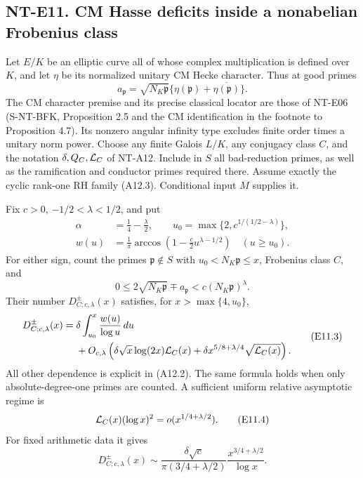 \subsection*{NT-E11. CM Hasse deficits inside a nonabelian Frobenius class}

Let \(E/K\) be an elliptic curve all of whose complex
multiplication is defined over \(K\), and let \(\eta\) be its
normalized unitary CM Hecke character. Thus at good primes
\[
 a_{\mathfrak p}
     =\sqrt{N_K\mathfrak p}
          \{\eta(\mathfrak p)+\overline{\eta(\mathfrak p)}\}.
                                                               \tag{E11.1}
\]
The CM character premise and its precise classical locator
are those of NT-E06 (S-NT-BFK, Proposition 2.5 and the CM
identification in the footnote to Proposition 4.7).
Its nonzero angular infinity type excludes finite order
times a unitary norm power.
Choose any finite Galois \(L/K\), any conjugacy class \(C\),
and the notation \(\delta,Q_C,{\cal L}_C\) of NT-A12.
Include in \(S\) all bad-reduction primes, as well as the
ramification and conductor primes required there.
Assume exactly the cyclic rank-one RH family (A12.3).
Conditional input \(M\) supplies it.

Fix \(c>0\), \(-1/2<\lambda<1/2\), and put
\[
 \begin{aligned}
 \alpha&=\frac14-\frac{\lambda}{2},\qquad
 u_0=\max\{2,c^{1/(1/2-\lambda)}\},\\
 w(u)&=\frac1\pi
       \arccos\left(1-\frac c2 u^{\lambda-1/2}\right)
                  \quad(u\ge u_0).
 \end{aligned}                                             \tag{E11.2}
\]
For either sign, count the primes \(\mathfrak p\notin S\)
with \(u_0<N_K\mathfrak p\le x\), Frobenius class \(C\), and
\[
       0\le 2\sqrt{N_K\mathfrak p}\mp a_{\mathfrak p}
                      <c(N_K\mathfrak p)^\lambda .
\]
Their number \(D_{C;c,\lambda}^{\pm}(x)\) satisfies, for
\(x>\max\{4,u_0\}\),
\[
 \begin{split}
 D_{C;c,\lambda}^{\pm}(x)
   ={}&\delta\int_{u_0}^x\frac{w(u)}{\log u}\,du\\
     &+O_{c,\lambda}\left(
        \delta\sqrt x\log(2x){\cal L}_C(x)
        +\delta x^{5/8+\lambda/4}\sqrt{{\cal L}_C(x)}
                        \right).                         
 \end{split} \tag{E11.3}
\]
All other dependence is explicit in (A12.2). The same formula
holds when only absolute-degree-one primes are counted.
A sufficient uniform relative asymptotic regime is
\[
       {\cal L}_C(x)(\log x)^2=o(x^{1/4+\lambda/2}).
                                                               \tag{E11.4}
\]
For fixed arithmetic data it gives
\[
 D_{C;c,\lambda}^{\pm}(x)
    \sim \frac{\delta\sqrt c}{\pi(3/4+\lambda/2)}
                    \frac{x^{3/4+\lambda/2}}{\log x}.
                                                               \tag{E11.5}
\]


